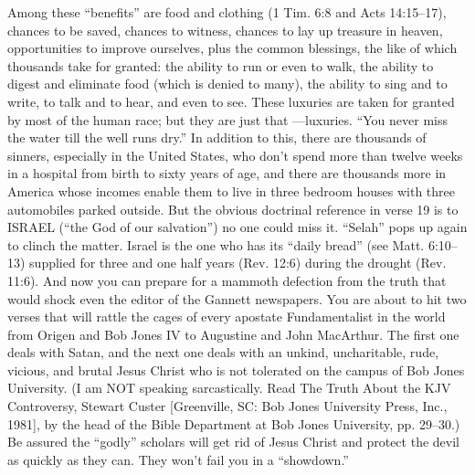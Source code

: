 {Among these “benefits” are food and clothing (1 Tim. 6:8 and Acts 14:15–17), chances to be saved, chances to witness, chances to lay up treasure in heaven, opportunities to improve ourselves, plus the common blessings, the like of which thousands take for granted: the ability to run or even to walk, the ability to digest and eliminate food (which is denied to many), the ability to sing and to write, to talk and to hear, and even to see. These luxuries are taken for granted by most of the human race; but they are just that —luxuries. “You never miss the water till the well runs dry.” In addition to this, there are thousands of sinners, especially in the United States, who don’t spend more than twelve weeks in a hospital from birth to sixty years of age, and there are thousands more in America whose incomes enable them to live in three bedroom houses with three automobiles parked outside. But the obvious doctrinal reference in verse 19 is to ISRAEL (“the God of our salvation”) no one could miss it. “Selah” pops up again to clinch the matter. Israel is the one who has its “daily bread” (see Matt. 6:10--13) supplied for three and one half years (Rev. 12:6) during the drought (Rev. 11:6). And now you can prepare for a mammoth defection from the truth that would shock even the editor of the Gannett newspapers. You are about to hit two verses that will rattle the cages of every apostate Fundamentalist in the world from Origen and Bob Jones IV to Augustine and John MacArthur. The first one deals with Satan, and the next one deals with an unkind, uncharitable, rude, vicious, and brutal Jesus Christ who is not tolerated on the campus of Bob Jones University. (I am NOT speaking sarcastically. Read The Truth About the KJV Controversy, Stewart Custer [Greenville, SC: Bob Jones University Press, Inc., 1981], by the head of the Bible Department at Bob Jones University, pp. 29–30.) Be assured the “godly” scholars will get rid of Jesus Christ and protect the devil as quickly as they can. They won’t fail you in a “showdown.”  \cite{Ruckman1992Psalms}  }
